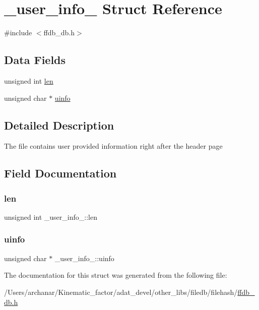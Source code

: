 \hypertarget{struct__user__info__}{}\section{\+\_\+user\+\_\+info\+\_\+ Struct Reference}
\label{struct__user__info__}


{\ttfamily \#include $<$ffdb\+\_\+db.\+h$>$}

\subsection*{Data Fields}
\begin{DoxyCompactItemize}
\item 
unsigned int \mbox{\hyperlink{struct__user__info___a1e0cc62555e343a5fb09fa0fa2bd34ad}{len}}
\item 
unsigned char $\ast$ \mbox{\hyperlink{struct__user__info___a5ab49a33da352185d28bdac39dee8fad}{uinfo}}
\end{DoxyCompactItemize}


\subsection{Detailed Description}
The file contains user provided information right after the header page 

\subsection{Field Documentation}
\mbox{\label{struct__user__info___a1e0cc62555e343a5fb09fa0fa2bd34ad}} 
\subsubsection{\texorpdfstring{len}{len}}
{\footnotesize\ttfamily unsigned int \+\_\+user\+\_\+info\+\_\+\+::len}

\mbox{\label{struct__user__info___a5ab49a33da352185d28bdac39dee8fad}} 
\subsubsection{\texorpdfstring{uinfo}{uinfo}}
{\footnotesize\ttfamily unsigned char $\ast$ \+\_\+user\+\_\+info\+\_\+\+::uinfo}



The documentation for this struct was generated from the following file\+:\begin{DoxyCompactItemize}
\item 
/\+Users/archanar/\+Kinematic\+\_\+factor/adat\+\_\+devel/other\+\_\+libs/filedb/filehash/\mbox{\hyperlink{other__libs_2filedb_2filehash_2ffdb__db_8h}{ffdb\+\_\+db.\+h}}\end{DoxyCompactItemize}
